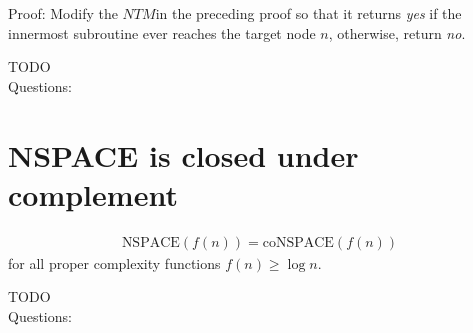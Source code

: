 \documentclass[a4]{scrartcl}
\begin{document}

Proof: Modify the $NTM $in the preceding proof so that it returns \textit{yes} if the innermost subroutine ever reaches the target node $n$, otherwise, return \textit{no}.

\color{red} TODO \\
\color{black}
\color{violet} Questions:
\color{black}



\section*{NSPACE is closed under complement}

\begin{align*}
\text{NSPACE}(f(n)) = \text{coNSPACE}(f(n))
\end{align*}
for all proper complexity functions $f(n) \geq \log n$.


\color{red} TODO \\
\color{black}
\color{violet} Questions:
\color{black}




\newpage

\printbibliography
\end{document}
